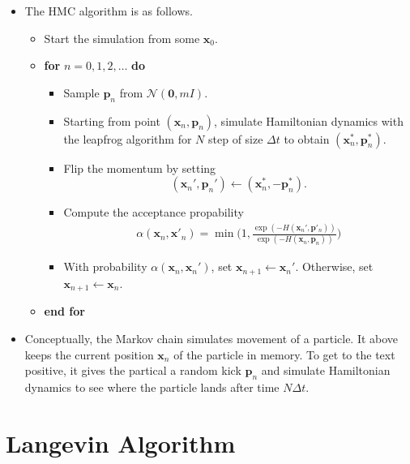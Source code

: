 \documentclass[10pt]{article}
\newcommand{\ve}[1]{\mathbf{#1}}
\newcommand{\mcal}[1]{\mathcal{#1}}
\begin{document}
\begin{itemize}
  \item The HMC algorithm is as follows.
  \begin{itemize}
    \item Start the simulation from some $\ve{x}_0$.
    
    \item {\bf for} $n = 0, 1, 2, \dotsc$ {\bf do}
    
    \begin{itemize}
      \item Sample $\ve{p}_n$ from $\mcal{N}(\ve{0}, mI)$.
      
      \item Starting from point $(\ve{x}_n, \ve{p}_n)$, simulate Hamiltonian dynamics with the leapfrog algorithm for $N$ step of size $\Delta t$ to obtain $(\ve{x}_n^*, \ve{p}^*_n)$.
      
      \item Flip the momentum by setting $$(\ve{x}_n', \ve{p}_n') \gets (\ve{x}_n^*, -\ve{p}_n^*).$$      
      
      \item Compute the acceptance propability 
      \begin{align*} 
        \alpha(\ve{x}_n, \ve{x}'_n) = \min\bigg(1 , \frac{\exp(-H(\ve{x}_n', \ve{p}'_n))}{\exp(-H(\ve{x}_n, \ve{p}_n))} \bigg)
      \end{align*}      
      
      \item With probability $\alpha(\ve{x}_n, \ve{x}_n')$, set $\ve{x}_{n+1} \gets \ve{x}_n'$. Otherwise, set $\ve{x}_{n+1} \gets \ve{x}_n$.
    \end{itemize}

    \item[] {\bf end for}
  \end{itemize}

  \item Conceptually, the Markov chain simulates movement of a particle. It above keeps the current position $\ve{x}_n$ of the particle in memory. To get to the text positive, it gives the partical a random kick $\ve{p}_n$ and simulate Hamiltonian dynamics to see where the particle lands after time $N\Delta t$.
\end{itemize}

\section{Langevin Algorithm}
\end{document}
